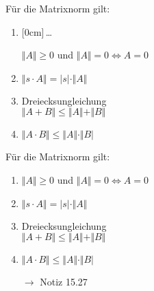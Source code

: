 \documentclass[11pt]{article}
\renewcommand{\cite}[1]{\par\bigskip\hfill{\color{gray}\tiny\(\to\) #1}}
\renewcommand{\leq}{\leqslant}
\renewcommand{\geq}{\geqslant}
\newcommand{\hide}[1]{\parbox{0cm}{\raisebox{-7pt}[0cm]{\dots}}\color{white}#1\color{black}}
\let\olddots\dots
\renewcommand{\dots}{\,\olddots\,}
\newenvironment{field}{}{\newpage}
\newif\ifnote
\newenvironment{note}{\notetrue}{\notefalse}
\newcommand{\localtag}{}
\newcommand{\globaltag}{}
\newcommand{\uuid}{}
\newcommand{\tags}[1]{
    \ifnote
        \renewcommand{\localtag}{#1}
    \else
        \renewcommand{\globaltag}{#1}
    \fi
    }
\newcommand{\xplain}[1]{\renewcommand{\uuid}{#1}}
\begin{document}
\begin{note}
    \tags{Satz}
    \xplain{1d0ba926-a85b-47e5-8c4b-c00669b8c6a6}

    \begin{field}
        Für die Matrixnorm gilt:
        \begin{enumerate}[(1)]
            \item \hide{$\Vert A \Vert \geq 0$ und $\Vert A \Vert = 0 \Leftrightarrow A = 0$}
            \item $\Vert s\cdot A\Vert = \vert s \vert\cdot\Vert A \Vert$
            \item Dreiecksungleichung\\
            $\Vert A+B\Vert \leq \Vert A\Vert+\Vert B \Vert$
            \item $\Vert A\cdot B\Vert \leq \Vert A\Vert\cdot\Vert B \vert$
        \end{enumerate}
    \end{field}
    \begin{field}
        Für die Matrixnorm gilt:
        \begin{enumerate}[(1)]
            \item $\Vert A \Vert \geq 0$ und $\Vert A \Vert = 0 \Leftrightarrow A = 0$
            \item $\Vert s\cdot A\Vert = \vert s \vert\cdot\Vert A \Vert$
            \item Dreiecksungleichung\\
            $\Vert A+B\Vert \leq \Vert A\Vert+\Vert B \Vert$
            \item $\Vert A\cdot B\Vert \leq \Vert A\Vert\cdot\Vert B \vert$
            \cite{Notiz 15.27}
        \end{enumerate}
    \end{field}


\end{note}
\end{document}
